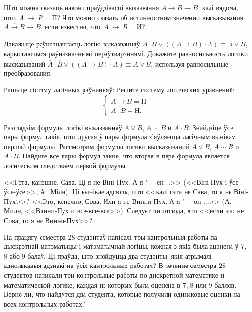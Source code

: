 \begin{problemList}

\problemItemSimple
{Што можна сказаць наконт праўдзівасці выказвання  $\overline{A \to B} \to B$, калі вядома, што~$A~\to~B = \mbox{П}$?}
{Что можно сказать об истинностном значении высказывания $\overline{A \to B} \to B$, если известно, что~$A~\to~B = \mbox{И}$?}

\bigskip

\problemItemSimple
{Дакажыце раўназначнасць логікі выказванняў $\overline{\overline{A} \cdot \overline{B}} \vee ((A \to B) \cdot A) \equiv A \vee B$,
карыстаючыся раўназначнымі пераўтварэннямі.}
{Докажите равносильность логики высказываний $\overline{\overline{A} \cdot \overline{B}} \vee ((A \to B) \cdot A) \equiv A \vee B$,
используя равносильные преобразования.}

\bigskip

\problemItemWithCommonPart
{Рашыце сістэму лагічных раўнанняў:}
{Решите систему логических уравнений:}
{\[\begin{cases} A \to \overline{B} = \mbox{П}; \\ A \cdot B = \mbox{Н}. \end{cases}\]}

\smallskip

\problemItemSimple
{Разглядзім формулы логікі выказванняў $A \vee B$, $\overline{A} \sim B$ и $\overline{A} \cdot B$.
Знайдзіце ўсе пары формул такія, што другая ў пары формула з'яўляецца лагічным вынікам першай формулы.}
{Рассмотрим формулы логики высказываний $A \vee B$, $\overline{A} \sim B$ и $\overline{A} \cdot B$.
Найдите все пары формул такие, что вторая в паре формула является логическим следствием первой формулы.}

\bigskip

\problemItemSimple
{<<Гэта, канешне, Сава. Ці я не Віні-Пух. А я "--- ён \dots>> (<<Віні-Пух і ўсе-ўсе-ўсе>>, А.~Мілн).
Ці вынікае адсюль, што <<калі гэта не Сава, то я не Віні-Пух>>?}
{<<Это, конечно, Сова. Или я не Винни-Пух. А я "--- он $\ldots$>> (А. Милн, <<Винни-Пух и все-все-все>>).
Следует ли отсюда, что <<если это не Сова, то я не Винни-Пух>>?}

\bigskip

\problemItemSimple
{На працягу семестра 28 студэнтаў напісалі тры кантрольныя работы па дыскрэтнай матэматыцы і матэматычнай логіцы,
кожная з якіх была ацэнена ў 7, 8 або 9 балаў.
Ці праўда, што знойдуцца два студэнты, якія атрымалі аднолькавыя адзнакі на ўсіх кантрольных работах?}
{В течение семестра 28 студентов написали три контрольные работы по дискретной математике и математической логике,
каждая из которых была оценена в 7, 8 или 9 баллов.
Верно ли, что найдутся два студента, которые получили одинаковые оценки на всех контрольных работах?}


\end{problemList}
